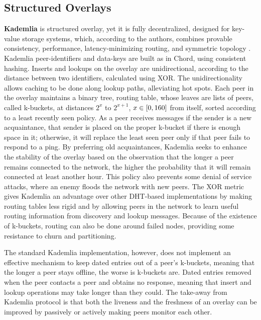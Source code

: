 \documentclass[runningheads]{llncs}
\begin{document}
\subsection{Structured Overlays}
\textbf{Kademlia} is structured overlay, yet it is fully decentralized, designed for key-value storage systems, which, according to the authors, combines provable consistency, performance, latency-minimizing routing, and symmetric topology \cite{kademlia}. Kademlia peer-identifiers and data-keys are built as in Chord\cite{chord}, using consistent hashing. Inserts and lookups on the overlay are unidirectional, according to the distance between two identifiers, calculated using XOR. The unidirectionality allows caching to be done along lookup paths, alleviating hot spots. Each peer in the overlay maintains a binary tree, routing table, whose leaves are lists of peers, called k-buckets, at distances $2^{x}$ to $2^{x+1}$, $x \in\hspace{1mm}\mathclose[0,160\mathclose]$ from itself, sorted according to a least recently seen policy. As a peer receives messages if the sender is a new acquaintance, that sender is placed on the proper k-bucket if there is enough space in it; otherwise, it will replace the least seen peer only if that peer fails to respond to a ping. By preferring old acquaintances, Kademlia seeks to enhance the stability of the overlay based on the observation that the longer a peer remains connected to the network, the higher the probability that it will remain connected at least another hour\cite{ssaroiu:msp2pfss}. This policy also prevents some denial of service attacks, where an enemy floods the network with new peers. The XOR metric gives Kademlia an advantage over other DHT-based implementations by making routing tables less rigid and by allowing peers in the network to learn useful routing information from discovery and lookup messages. Because of the existence of k-buckets, routing can also be done around failed nodes, providing some resistance to churn and partitioning.

The standard Kademlia implementation, however, does not implement an effective mechanism to keep dated entries out of a peer's k-buckets, meaning that the longer a peer stays offline, the worse is k-buckets are. Dated entries removed when the peer contacts a peer and obtains no response, meaning that insert and lookup operations may take longer than they could. The take-away from Kademlia protocol is that both the liveness and the freshness of an overlay can be improved by passively or actively making peers monitor each other.\newline
\end{document}
